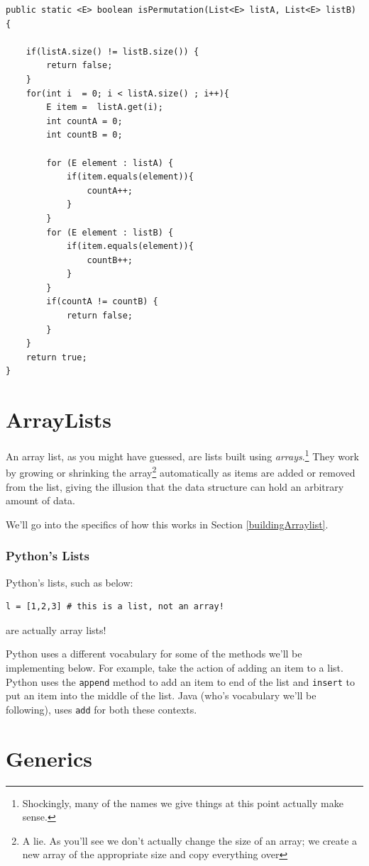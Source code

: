 \documentclass[10pt,a4paper]{book}
\begin{document}
\begin{verbatim}
public static <E> boolean isPermutation(List<E> listA, List<E> listB) {
	
	if(listA.size() != listB.size()) {
		return false;
	}
	for(int i  = 0; i < listA.size() ; i++){
		E item =  listA.get(i);
		int countA = 0;
		int countB = 0;
		
		for (E element : listA) {
			if(item.equals(element)){
				countA++;
			}
		}
		for (E element : listB) {
			if(item.equals(element)){
				countB++;
			}
		}
		if(countA != countB) {
			return false;
		}
	}
	return true;
}
\end{verbatim}



\section{ArrayLists}
An array list, as you might have guessed, are lists built using \textit{arrays}.\footnote{Shockingly, many of the names we give things at this point actually make sense.}
They work by growing or shrinking the array\footnote{A lie.  As you'll see we don't actually change the size of an array;  we create a new array of the appropriate size and copy everything over} automatically as items are added or removed from the list, giving the illusion that the data structure can hold an arbitrary amount of data.

We'll go into the specifics of how this works in Section \ref{buildingArraylist}.


\subsubsection{Python's Lists}
Python's lists, such as below:
\begin{verbatim}
l = [1,2,3] # this is a list, not an array!	
\end{verbatim}
are actually array lists! %

Python uses a different vocabulary for some of the methods we'll be implementing below.  
For example, take the action of adding an item to a list.
Python uses the \texttt{append} method to add an item to end of the list and \texttt{insert} to put an item into the middle of the list.
Java (who's vocabulary we'll be following), uses \texttt{add} for both these contexts. 



\section{Generics}
\end{document}
